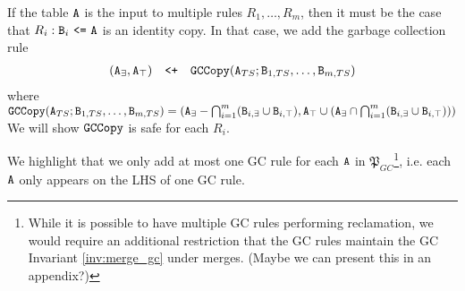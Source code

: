 If the table $\tt{A}$ is the input to multiple rules $R_1, \dots, R_m$, then it must be the case that $R_i: \tt{B}_i ~\tt{<=}~ \tt{A}$ is an identity copy.
In that case, we add the garbage collection rule
\begin{align}
(\tt{A}_\exists, \tt{A}_\top) \quad\tt{<+}\quad \tt{GCCopy}(\tt{A}_{TS}; \tt{B}_{1,TS}, \dots, \tt{B}_{m,TS})
\end{align}
where $\tt{GCCopy}(\tt{A}_{TS}; \tt{B}_{1,TS}, \dots, \tt{B}_{m,TS}) = \left(\tt{A}_\exists - \bigcap_{i=1}^m (\tt{B}_{i,\exists} \cup \tt{B}_{i,\top}), \tt{A}_\top \cup \left(\tt{A}_\exists \cap \bigcap_{i=1}^m (\tt{B}_{i,\exists} \cup \tt{B}_{i,\top})\right)\right)$
We will show $\tt{GCCopy}$ is safe for each $R_i$.

We highlight that we only add at most one GC rule for each $\tt{A}$ in $\mathfrak{P}_{GC}$\footnote{
While it is possible to have multiple GC rules performing reclamation, we would require an additional restriction that the GC rules maintain the GC Invariant \ref{inv:merge_gc} under merges.
(Maybe we can present this in an appendix?)
}, i.e. each $\tt{A}$ only appears on the LHS of one GC rule.


